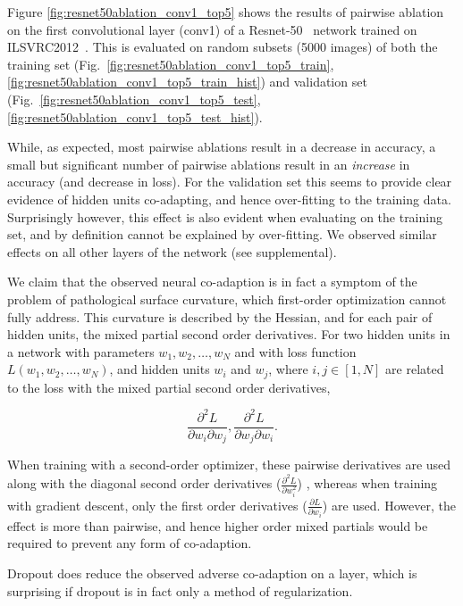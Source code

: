 \documentclass[thesis]{subfiles}
\begin{document}
Figure \ref{fig:resnet50ablation_conv1_top5} shows the results of pairwise ablation on the first convolutional layer (conv1) of a Resnet-50~\citet{He2015} network trained on ILSVRC2012~\citep{ILSVRC2015}. This is evaluated on random subsets (5000 images) of both the training set (Fig.~\ref{fig:resnet50ablation_conv1_top5_train},\ref{fig:resnet50ablation_conv1_top5_train_hist}) and validation set (Fig.~\ref{fig:resnet50ablation_conv1_top5_test},\ref{fig:resnet50ablation_conv1_top5_test_hist}).

While, as expected, most pairwise ablations result in a decrease in accuracy, a small but significant number of pairwise ablations result in an \emph{increase} in accuracy (and decrease in loss). For the validation set this seems to provide clear evidence of hidden units co-adapting, and hence over-fitting to the training data. Surprisingly however, this effect is also evident when evaluating on the training set, and by definition cannot be explained by over-fitting. We observed similar effects on all other layers of the network (see supplemental).

We claim that the observed neural co-adaption is in fact a symptom of the problem of pathological surface curvature, which first-order optimization cannot fully address. This curvature is described by the Hessian, and for each pair of hidden units, the mixed partial second order derivatives. For two hidden units in a network with parameters $w_1, w_2, \ldots, w_N$ and with loss function $L(w_1, w_2, \ldots, w_N)$, and hidden units $w_i$ and $w_j$, where $i,j \in [1, N]$ are related to the loss with the mixed partial second order derivatives,

\begin{equation}
\frac{\partial^2 L}{\partial w_i \partial w_j}, \frac{\partial^2 L}{\partial w_j \partial w_i}.
\end{equation}

When training with a second-order optimizer, these pairwise derivatives are used along with the diagonal second order derivatives (\ie $\frac{\partial^2 L}{\partial w_i^2}$) , whereas when training with gradient descent, only the first order derivatives (\ie $\frac{\partial L}{\partial w_i}$) are used. However, the effect is more than pairwise, and hence higher order mixed partials would be required to prevent any form of co-adaption.

Dropout does reduce the observed adverse co-adaption on a layer, which is surprising if dropout is in fact only a method of regularization.
\end{document}
